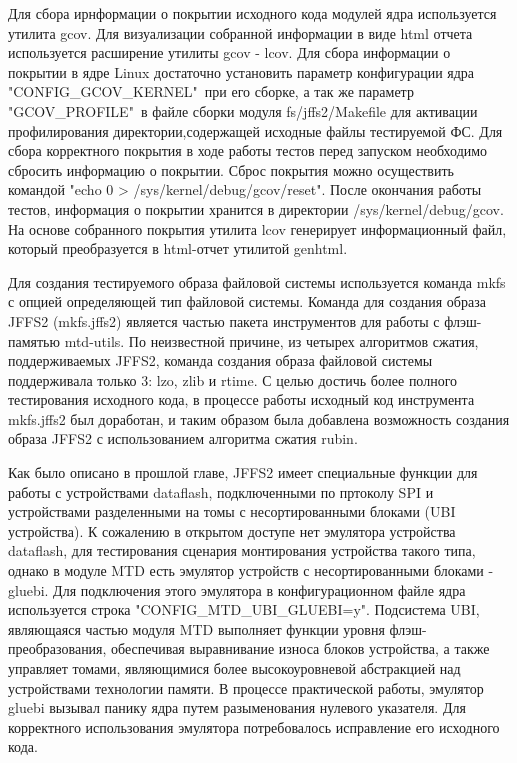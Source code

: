 Для сбора ирнформации о покрытии исходного кода модулей ядра используется утилита gcov. Для визуализации собранной информации в виде html отчета используется расширение утилиты gcov - lcov. Для сбора информации о покрытии в ядре Linux достаточно установить параметр конфигурации ядра "CONFIG\_GCOV\_KERNEL"\ при его сборке, а так же параметр "GCOV\_PROFILE"\ в файле сборки модуля fs/jffs2/Makefile для активации профилирования директории,содержащей исходные файлы тестируемой ФС. Для сбора корректного покрытия в ходе работы тестов перед запуском необходимо сбросить информацию о покрытии. Сброс покрытия можно осуществить командой  "echo 0 > /sys/kernel/debug/gcov/reset". После окончания работы тестов, информация о покрытии хранится в директории /sys/kernel/debug/gcov. На основе собранного покрытия утилита lcov генерирует информационный файл, который преобразуется в html-отчет утилитой genhtml.

Для создания тестируемого образа файловой системы используется команда mkfs с опцией определяющей тип файловой системы. Команда для создания образа JFFS2 (mkfs.jffs2) является частью пакета инструментов для работы с флэш-памятью mtd-utils. По неизвестной причине, из четырех алгоритмов сжатия, поддерживаемых JFFS2, команда создания образа файловой системы поддерживала только 3: lzo, zlib и rtime. С целью достичь более полного тестирования исходного кода, в процессе работы исходный код инструмента mkfs.jffs2 был доработан, и таким образом была добавлена возможность создания образа JFFS2 с использованием алгоритма сжатия rubin.

Как было описано в прошлой главе, JFFS2 имеет специальные функции для работы с устройствами dataflash, подключенными по пртоколу SPI и устройствами разделенными на томы с несортированными блоками (UBI устройства). К сожалению в открытом доступе нет эмулятора устройства dataflash, для тестирования сценария монтирования устройства такого типа, однако в модуле MTD есть эмулятор устройств с несортированными блоками - gluebi. Для подключения этого эмулятора в конфигурационном файле ядра используется строка "CONFIG\_MTD\_UBI\_GLUEBI=y". Подсистема UBI, являющаяся частью модуля MTD выполняет функции уровня флэш-преобразования, обеспечивая выравнивание износа блоков устройства, а также управляет томами, являющимися более высокоуровневой абстракцией над устройствами технологии памяти. В процессе практической работы, эмулятор gluebi вызывал панику ядра путем разыменования нулевого указателя. Для корректного использования эмулятора потребовалось исправление его исходного кода.

